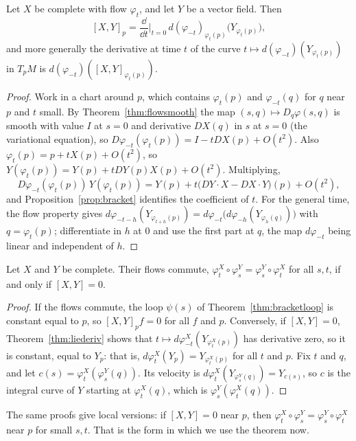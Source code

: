 \begin{theorem}\label{thm:liederiv}
Let $X$ be complete with flow $\varphi_t$, and let $Y$ be a vector field. Then
\[
[X,Y]_p=\frac{\dd}{\dd t}\Big|_{t=0}\,d(\varphi_{-t})_{\varphi_t(p)}\bigl(Y_{\varphi_t(p)}\bigr),
\]
and more generally the derivative at time $t$ of the curve $t\mapsto d(\varphi_{-t})(Y_{\varphi_t(p)})$ in $T_pM$ is $d(\varphi_{-t})([X,Y]_{\varphi_t(p)})$.
\end{theorem}
\begin{proof}
Work in a chart around $p$, which contains $\varphi_t(p)$ and $\varphi_{-t}(q)$ for $q$ near $p$ and $t$ small. By Theorem~\ref{thm:flowsmooth} the map
$(s,q)\mapsto D_q\varphi(s,q)$ is smooth with value $I$ at $s=0$ and derivative $DX(q)$ in $s$ at $s=0$ (the variational equation), so
$D\varphi_{-t}(\varphi_t(p))=I-tDX(p)+O(t^2)$. Also $\varphi_t(p)=p+tX(p)+O(t^2)$, so $Y(\varphi_t(p))=Y(p)+tDY(p)X(p)+O(t^2)$. Multiplying,
\[
D\varphi_{-t}(\varphi_t(p))\,Y(\varphi_t(p))=Y(p)+t\bigl(DY\cdot X-DX\cdot Y\bigr)(p)+O(t^2),
\]
and Proposition~\ref{prop:bracket} identifies the coefficient of $t$. For the general time, the flow property gives
$d\varphi_{-t-h}(Y_{\varphi_{t+h}(p)})=d\varphi_{-t}\bigl(d\varphi_{-h}(Y_{\varphi_h(q)})\bigr)$ with $q=\varphi_t(p)$; differentiate in $h$ at $0$ and use the first part at $q$,
the map $d\varphi_{-t}$ being linear and independent of $h$.
\end{proof}

\begin{theorem}\label{thm:commuting}
Let $X$ and $Y$ be complete. Their flows commute, $\varphi^X_t\circ\varphi^Y_s=\varphi^Y_s\circ\varphi^X_t$ for all $s,t$, if and only if $[X,Y]=0$.
\end{theorem}
\begin{proof}
If the flows commute, the loop $\psi(s)$ of Theorem~\ref{thm:bracketloop} is constant equal to $p$, so $[X,Y]_pf=0$ for all $f$ and $p$. Conversely, if
$[X,Y]=0$, Theorem~\ref{thm:liederiv} shows that $t\mapsto d\varphi^X_{-t}(Y_{\varphi^X_t(p)})$ has derivative zero, so it is constant, equal to $Y_p$: that is,
$d\varphi^X_t(Y_p)=Y_{\varphi^X_t(p)}$ for all $t$ and $p$. Fix $t$ and $q$, and let $c(s)=\varphi^X_t(\varphi^Y_s(q))$. Its velocity is
$d\varphi^X_t(Y_{\varphi^Y_s(q)})=Y_{c(s)}$, so $c$ is the integral curve of $Y$ starting at $\varphi^X_t(q)$, which is $\varphi^Y_s(\varphi^X_t(q))$.
\end{proof}

The same proofs give local versions: if $[X,Y]=0$ near $p$, then $\varphi^X_t\circ\varphi^Y_s=\varphi^Y_s\circ\varphi^X_t$ near $p$ for small $s,t$. That is the form in
which we use the theorem now.

